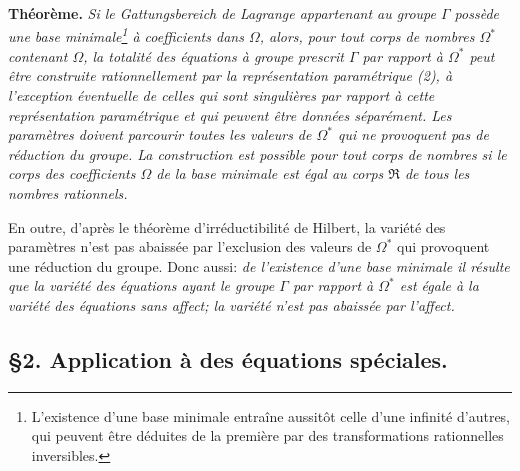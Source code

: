 \smallskip
\noindent\textbf{Théorème.} \emph{Si le \emph{Gattungsbereich} de Lagrange appartenant au groupe $\Gamma$ possède une base minimale\footnote{L'existence d'une base minimale entraîne aussitôt celle d'une infinité d'autres, qui peuvent être déduites de la première par des transformations rationnelles inversibles.} à coefficients dans $\Omega$, alors, pour tout corps de nombres $\Omega^*$ contenant $\Omega$, la totalité des équations à groupe prescrit $\Gamma$ par rapport à $\Omega^*$ peut être construite rationnellement par la représentation paramétrique (2), à l'exception éventuelle de celles qui sont singulières par rapport à cette représentation paramétrique et qui peuvent être données séparément. Les paramètres doivent parcourir toutes les valeurs de $\Omega^*$ qui ne provoquent pas de réduction du groupe. La construction est possible pour tout corps de nombres si le corps des coefficients $\Omega$ de la base minimale est égal au corps $\mathfrak R$ de tous les nombres rationnels.}

En outre, d'après le théorème d'irréductibilité de Hilbert, la variété des paramètres n'est pas abaissée par l'exclusion des valeurs de $\Omega^*$ qui provoquent une réduction du groupe. Donc aussi: \emph{de l'existence d'une base minimale il résulte que la variété des équations ayant le groupe $\Gamma$ par rapport à $\Omega^*$ est égale à la variété des équations sans affect; la variété n'est pas abaissée par l'affect.}

\subsection*{\S 2. Application à des équations spéciales.}

